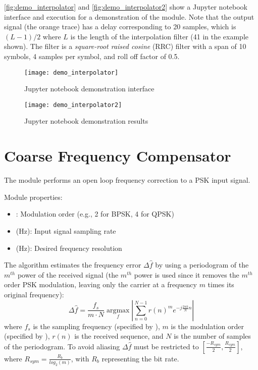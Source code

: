 \autoref{fig:demo_interpolator} and \autoref{fig:demo_interpolator2} show a Jupyter notebook interface and execution for a demonstration of the  module. Note that the output signal (the orange trace) has a delay corresponding to 20 samples, which is $(L-1)/2$ where $L$ is the length of the interpolation filter (41 in the example shown). The filter is a \emph{square-root raised cosine} (RRC) filter with a span of 10 symbols, 4 samples per symbol, and roll off factor of 0.5.

\begin{figure}[H]
  \centering
  \texttt{[image: demo\_interpolator]}
  \caption{ Jupyter notebook demonstration interface}
  \label{fig:demo_interpolator}
\end{figure}

\begin{figure}[H]
  \centering
  \texttt{[image: demo\_interpolator2]}
  \caption{ Jupyter notebook demonstration results}
  \label{fig:demo_interpolator2}
\end{figure}

\section{Coarse Frequency Compensator}

The  module performs an open loop frequency correction to a PSK input signal.

\noindent Module properties:
\begin{itemize}
  \item {}: Modulation order (e.g., 2 for BPSK, 4 for QPSK)
  \item {} (Hz): Input signal sampling rate
  \item {} (Hz): Desired frequency resolution
\end{itemize}

The algorithm estimates the frequency error $\Delta\hat{f}$ by using a periodogram of the $m^{th}$ power of the received signal (the $m^{th}$ power is used since it removes the $m^{th}$ order PSK modulation, leaving only the carrier at a frequency $m$ times its original frequency):
\begin{equation}
\Delta\hat{f}=\frac{f_s}{m\cdot N}\underset{f}{\operatorname{argmax}}\left|\sum_{n=0}^{N-1} r(n)^m e^{-j\frac{2\pi k}{N}n}\right|
\end{equation}
where $f_s$ is the sampling frequency (specified by ), $m$ is the modulation order (specified by ), $r(n)$ is the received sequence, and $N$ is the number of samples of the periodogram. To avoid aliasing $\Delta\hat{f}$ must be restricted to $\left[\frac{-R_{sym}}{2}, \frac{R_{sym}}{2}\right]$, where $R_{sym}=\frac{R_b}{log_2(m)}$, with $R_b$ representing the bit rate.

